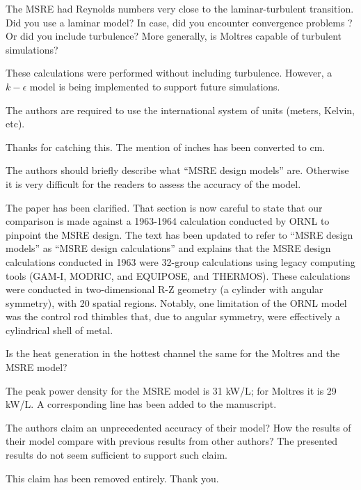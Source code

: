 \documentclass[answers,11pt]{exam}
\begin{document}
\begin{questions}
\question The MSRE had Reynolds numbers very close to the laminar-turbulent
transition. Did you use a laminar model? In case, did you encounter convergence
problems ?  Or did you include turbulence? More generally, is Moltres capable of
turbulent simulations?
\begin{solution}
        These calculations were performed without including turbulence. However,
        a $k-\epsilon$ model is being implemented to support future simulations.
\end{solution}

\question The authors are required to use the international system of units (meters, Kelvin, etc).
\begin{solution}
        Thanks for catching this. The mention of inches has been converted to cm.
\end{solution}

\question The authors should briefly describe what ``MSRE design models''
are. Otherwise it is very difficult for the readers to assess the accuracy of
the model.
\begin{solution}
        The paper has been clarified. That section is now careful to state that
        our comparison is made against a 1963-1964 calculation conducted by ORNL
        to pinpoint the MSRE design. The text has been updated to refer to
        ``MSRE design models'' as ``MSRE design calculations'' and explains
        that the MSRE design calculations conducted in 1963 were 32-group
        calculations using legacy computing tools (GAM-I, MODRIC, and EQUIPOSE,
        and THERMOS). These calculations were conducted in two-dimensional R-Z
        geometry (a cylinder with angular symmetry), with 20 spatial regions.
        Notably, one limitation of the ORNL model was the control rod thimbles
        that, due to angular symmetry, were effectively a cylindrical shell of
        metal.
\end{solution}

\question Is the heat generation in the hottest channel the same for the Moltres and the MSRE model?
\begin{solution}
        The peak power density for the MSRE model is 31 kW/L; for Moltres it is
        29 kW/L. A corresponding line has been added to the manuscript.
\end{solution}

\question The authors claim an unprecedented accuracy of their model? How the
results of their model compare with previous results from other authors? The
presented results do not seem sufficient to support such claim.
\begin{solution}
        This claim has been removed entirely. Thank you.
\end{solution}


\end{questions}
\end{document}
